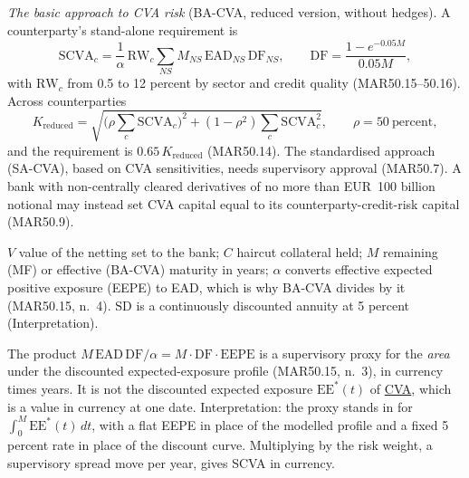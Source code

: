 \begin{qfrule}
\emph{The basic approach to CVA risk} (BA-CVA, reduced version, without hedges). A counterparty's stand-alone requirement is
\[ \mathrm{SCVA}_c=\frac1\alpha\,\mathrm{RW}_c\sum_{NS}M_{NS}\,\mathrm{EAD}_{NS}\,\mathrm{DF}_{NS},\qquad \mathrm{DF}=\frac{1-e^{-0.05M}}{0.05M}, \]
with $\mathrm{RW}_c$ from 0.5 to 12 percent by sector and credit quality (MAR50.15--50.16). Across counterparties
\[ K_{\text{reduced}}=\sqrt{\Big(\rho\sum_c\mathrm{SCVA}_c\Big)^2+(1-\rho^2)\sum_c\mathrm{SCVA}_c^2},\qquad\rho=50\ \text{percent}, \]
and the requirement is $0.65\,K_{\text{reduced}}$ (MAR50.14). The standardised approach (SA-CVA), based on CVA sensitivities, needs supervisory approval (MAR50.7). A bank with non-centrally cleared derivatives of no more than EUR~100 billion notional may instead set CVA capital equal to its counterparty-credit-risk capital (MAR50.9).

 $V$ value of the netting set to the bank; $C$ haircut collateral held; $M$ remaining (MF) or effective (BA-CVA) maturity in years; $\alpha$ converts effective expected positive exposure (EEPE) to EAD, which is why BA-CVA divides by it (MAR50.15, n.~4). $\mathrm{SD}$ is a continuously discounted annuity at 5 percent (Interpretation).

The product $M\,\mathrm{EAD}\,\mathrm{DF}/\alpha=M\cdot\mathrm{DF}\cdot\mathrm{EEPE}$ is a supervisory proxy for the \emph{area} under the discounted expected-exposure profile (MAR50.15, n.~3), in currency times years. It is not the discounted expected exposure $\mathrm{EE}^*(t)$ of \hyperref[meth:credit-valuation-adjustment]{CVA}, which is a value in currency at one date. Interpretation: the proxy stands in for $\int_0^M\mathrm{EE}^*(t)\,dt$, with a flat EEPE in place of the modelled profile and a fixed 5 percent rate in place of the discount curve. Multiplying by the risk weight, a supervisory spread move per year, gives SCVA in currency.


\end{qfrule}

